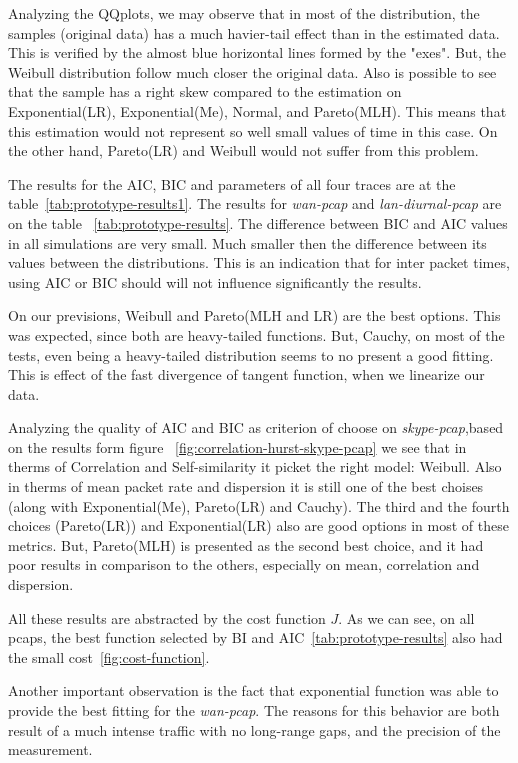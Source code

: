Analyzing the QQplots, we may observe that in most of the distribution, the samples (original data) has a much havier-tail effect than in the estimated data. This is verified by the almost blue horizontal lines formed by the "exes". But, the Weibull distribution follow much closer the original data. Also is possible to see that the sample has a right skew compared to the estimation on Exponential(LR), Exponential(Me), Normal, and Pareto(MLH). This means that this estimation would not represent so well small values of time in this case. On the other hand, Pareto(LR) and Weibull would not suffer from this problem.

The results for the AIC, BIC and parameters of all four traces are at the table~\ref{tab:prototype-results1}.  The results for \textit{wan-pcap} and \textit{lan-diurnal-pcap} are on the table ~\ref{tab:prototype-results}. The difference between BIC and AIC values in all simulations are very small. Much smaller then the difference between its values between the distributions. This is an indication that for inter packet times, using AIC or BIC should will not influence significantly the results. 

On our previsions, Weibull and Pareto(MLH and LR) are the best options. This was expected, since both are heavy-tailed functions. But, Cauchy, on most of the tests, even being a heavy-tailed distribution seems to no present a good fitting. This is effect of the fast divergence of tangent function, when we linearize our data. 

Analyzing the quality of AIC and BIC as criterion of choose on \textit{skype-pcap},based on the results form figure ~\ref{fig:correlation-hurst-skype-pcap} we see that in therms of Correlation and Self-similarity it picket the right model: Weibull. Also in therms of mean packet rate and dispersion it is still one of the best choises (along with Exponential(Me), Pareto(LR) and Cauchy). The third and the fourth choices (Pareto(LR)) and Exponential(LR) also are good options in most of these metrics. But, Pareto(MLH) is presented as the second best choice, and it had poor results in comparison to the others, especially on mean, correlation and dispersion. 

All these results are abstracted by the cost function $J$. As we can see, on all pcaps, the best function selected by BI and AIC~\ref{tab:prototype-results} also had the small cost~\ref{fig:cost-function}. 

Another important observation is the fact that exponential function was able to provide the best fitting for the \textit{wan-pcap}. The reasons for this behavior are both result of a much intense traffic with no long-range gaps, and the precision of the measurement.

